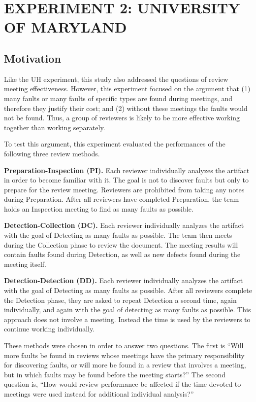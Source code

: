 \section{EXPERIMENT 2: UNIVERSITY OF MARYLAND} 
\label{um-experiment}

\subsection{Motivation}

Like the UH experiment, this study also addressed the questions of 
review meeting effectiveness. However, this experiment focused on 
the argument that (1) many faults or many faults of 
specific types are found during meetings, and therefore they justify their 
cost; and (2) without these meetings the faults would not be found.
Thus, a group of reviewers is likely to be more effective 
working together than working separately.

To test this argument, this experiment evaluated the 
performances of the following three review methods.

{\bf Preparation-Inspection (PI).}  Each reviewer individually analyzes the
artifact in order to become familiar with it.  The goal is not to
discover faults but only to prepare for the review meeting. Reviewers are
prohibited from taking any notes during Preparation.  After all reviewers have
completed Preparation, the team holds an Inspection meeting to
find as many faults as possible.

{\bf Detection-Collection (DC).} Each reviewer individually analyzes the
artifact with the goal of Detecting as many faults as possible. The 
team then meets during the Collection phase to review the document. 
The meeting results will contain faults found during Detection, as
well as new defects found during the meeting itself.

{\bf Detection-Detection (DD).}  Each reviewer individually analyzes the
artifact with the goal of Detecting as many faults as possible. After all
reviewers complete the Detection phase, they are asked to repeat
Detection a second time, again individually, and again with the goal of
detecting as many faults as possible.  This approach does not involve 
a meeting. Instead the time is used by the reviewers to continue working individually.

These methods were chosen in order to answer two questions. The first is
``Will more faults be found in reviews whose meetings have the primary responsibility 
for discovering faults, or will more be found in a review that involves a meeting, but 
in which faults may be found before the meeting starts?''
The second question is, ``How would review performance be affected if the 
time devoted to meetings were used instead for additional individual analysis?'' 


